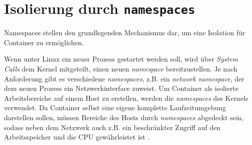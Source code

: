 \documentclass[../main.tex]{subfiles}
\begin{document}




	\section{Isolierung durch \texttt{namespaces}}
  \label{secIsolierung}
		Namespaces stellen den grundlegenden Mechanismus dar, um eine Isolation für Container zu ermöglichen.

		Wenn unter Linux ein neuer Prozess gestartet werden soll, wird über \emph{System Calls} dem Kernel mitgeteilt, einen neuen \emph{namespace} bereitzustellen. Je nach Anforderung gibt es verschiedene \emph{namespaces}, z.B. ein \emph{network namespace}, der dem neuen Prozess ein Netzwerkinterface zuweist. Um Container als isolierte Arbeitsbereiche auf einem Host zu erstellen, werden die \emph{namespaces} des Kernels verwendet. Da Container selbst eine eigene komplette Laufzeitumgebung darstellen sollen, müssen Bereiche des Hosts durch \emph{namespaces} abgedeckt sein, sodass neben dem Netzwerk auch z.B. ein beschränkter Zugriff auf den Arbeitsspeicher und die \acrshort{CPU} gewährleistet ist \cite[S.3]{dockerIntroIEEE}.
\end{document}
